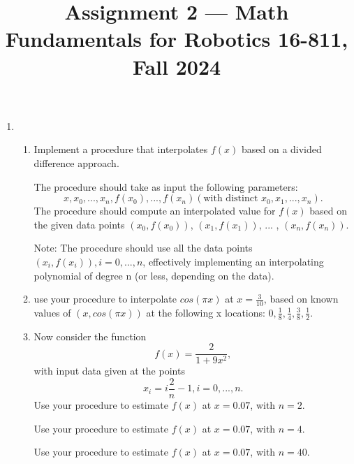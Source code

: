 \documentclass[conference,onecolumn]{IEEEtran}
\begin{document}
\title{\Large Assignment 2 --- Math Fundamentals for Robotics 16-811, Fall 2024}

\author{
}

\maketitle

\begin{enumerate}[label=\arabic{enumi}.]
    \item \begin{enumerate}
              \item Implement a procedure that interpolates $f(x)$ based on a divided difference approach.

                    The procedure should take as input the following parameters:
                    $$
                        x, x_0, ... , x_n, f(x_0), ... , f(x_n) (\text{with distinct } x_0, x_1, ... , x_n).
                    $$
                    The procedure should compute an interpolated value for $f(x)$ based on the given data points $(x_0, f(x_0))$, $(x_1, f(x_1))$, ... , $(x_n, f(x_n))$.

                    Note: The procedure should use all the data points $(x_i, f(x_i)), i = 0, ... , n$, effectively implementing an interpolating polynomial of degree n (or less, depending on the data).
              \item use your procedure to interpolate $cos(\pi x)$ at $x = \frac{3}{10}$, based on known values of $(x, cos(\pi x))$ at the following x locations: $0, \frac{1}{8}, \frac{1}{4}, \frac{3}{8}, \frac{1}{2}$.
              \item Now consider the function
                    $$
                        f(x) = \frac{2}{1 + 9x^2},
                    $$
                    with input data given at the points
                    $$
                        x_i = i \frac{2}{n} - 1, i = 0, ... , n.
                    $$
                    Use your procedure to estimate $f(x)$ at $x = 0.07$, with $n = 2$.

                    Use your procedure to estimate $f(x)$ at $x = 0.07$, with $n = 4$.

                    Use your procedure to estimate $f(x)$ at $x = 0.07$, with $n = 40$.


\end{enumerate}
\end{enumerate}
\end{document}
